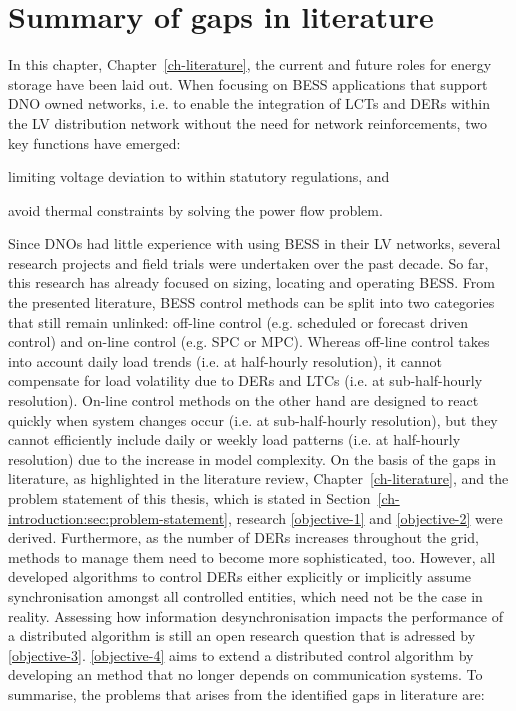 \section{Summary of gaps in literature}
\label{ch-literature:sec:literature-gaps}

In this chapter, Chapter~\ref{ch-literature}, the current and future roles for energy storage have been laid out.
When focusing on BESS applications that support DNO owned networks, i.e. to enable the integration of LCTs and DERs within the LV distribution network without the need for network reinforcements, two key functions have emerged:
\begin{enumerate*}
	\item limiting voltage deviation to within statutory regulations, and
	\item avoid thermal constraints by solving the power flow problem.
\end{enumerate*}
Since DNOs had little experience with using BESS in their LV networks, several research projects and field trials were undertaken over the past decade.
So far, this research has already focused on sizing, locating and operating BESS.
From the presented literature, BESS control methods can be split into two  categories that still remain unlinked: off-line control (e.g. scheduled or forecast driven control) and on-line control (e.g. SPC or MPC).
Whereas off-line control takes into account daily load trends (i.e. at half-hourly resolution), it cannot compensate for load volatility due to DERs and LTCs (i.e. at sub-half-hourly resolution).
On-line control methods on the other hand are designed to react quickly when system changes occur (i.e. at sub-half-hourly resolution), but they cannot efficiently include daily or weekly load patterns (i.e. at half-hourly resolution) due to the increase in model complexity.
On the basis of the gaps in literature, as highlighted in the literature review, Chapter~\ref{ch-literature}, and the problem statement of this thesis, which is stated in Section~\ref{ch-introduction:sec:problem-statement}, research \ref{objective-1} and \ref{objective-2} were derived.
Furthermore, as the number of DERs increases throughout the grid, methods to manage them need to become more sophisticated, too.
However, all developed algorithms to control DERs either explicitly or implicitly assume synchronisation amongst all controlled entities, which need not be the case in reality.
Assessing how information desynchronisation impacts the performance of a distributed algorithm is still an open research question that is adressed by \ref{objective-3}.
\ref{objective-4} aims to extend a distributed control algorithm by developing an method that no longer depends on communication systems.
To summarise, the problems that arises from the identified gaps in literature are:

